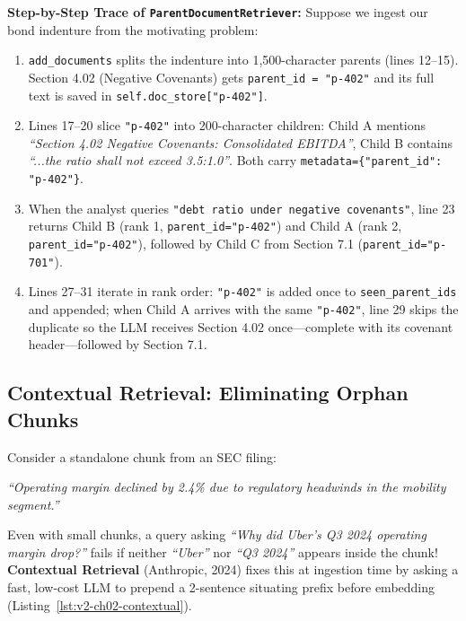 \textbf{Step-by-Step Trace of \texttt{ParentDocumentRetriever}:}
Suppose we ingest our bond indenture from the motivating problem:
\begin{enumerate}[leftmargin=18pt]
  \item \texttt{add\_documents} splits the indenture into 1,500-character parents (lines 12--15). Section 4.02 (Negative Covenants) gets \texttt{parent\_id = "p-402"} and its full text is saved in \texttt{self.doc\_store["p-402"]}.
  \item Lines 17--20 slice \texttt{"p-402"} into 200-character children: Child A mentions \emph{``Section 4.02 Negative Covenants: Consolidated EBITDA''}, Child B contains \emph{``...the ratio shall not exceed 3.5:1.0''}. Both carry \texttt{metadata=\{"parent\_id": "p-402"\}}.
  \item When the analyst queries \texttt{"debt ratio under negative covenants"}, line 23 returns Child B (rank 1, \texttt{parent\_id="p-402"}) and Child A (rank 2, \texttt{parent\_id="p-402"}), followed by Child C from Section 7.1 (\texttt{parent\_id="p-701"}).
  \item Lines 27--31 iterate in rank order: \texttt{"p-402"} is added once to \texttt{seen\_parent\_ids} and appended; when Child A arrives with the same \texttt{"p-402"}, line 29 skips the duplicate so the LLM receives Section 4.02 once—complete with its covenant header—followed by Section 7.1.
\end{enumerate}

\subsection{Contextual Retrieval: Eliminating Orphan Chunks}
Consider a standalone chunk from an SEC filing:
\begin{center}
\emph{``Operating margin declined by 2.4\% due to regulatory headwinds in the mobility segment.''}
\end{center}
Even with small chunks, a query asking \emph{``Why did Uber's Q3 2024 operating margin drop?''} fails if neither \emph{``Uber''} nor \emph{``Q3 2024''} appears inside the chunk! \textbf{Contextual Retrieval} (Anthropic, 2024) fixes this at ingestion time by asking a fast, low-cost LLM to prepend a 2-sentence situating prefix before embedding (Listing~\ref{lst:v2-ch02-contextual}).


